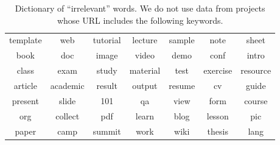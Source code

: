 \documentclass[sigconf,anonymous,review]{acmart}
\begin{document}
 
\begin{table}[!b]
\caption{Dictionary of ``irrelevant'' words. We do not use data from projects whose URL includes the following keywords.}
\label{tbl:dict}
\begin{adjustbox}{max width=0.48\textwidth}
\begin{tabular}{ccccccc}
\rowcolor[HTML]{BDBDBD} 
\multicolumn{7}{c}{\cellcolor[HTML]{BDBDBD}{\color[HTML]{000000} Suspicious Keywords}} \\ \hline
\rowcolor[HTML]{FFFFFF} 
{\color[HTML]{000000} template} & {\color[HTML]{000000} web} & {\color[HTML]{000000} tutorial} & {\color[HTML]{000000} lecture} & {\color[HTML]{000000} sample} & {\color[HTML]{000000} note} & {\color[HTML]{000000} sheet} \\
\rowcolor[HTML]{F3F3F3} 
{\color[HTML]{000000} book} & {\color[HTML]{000000} doc} & {\color[HTML]{000000} image} & {\color[HTML]{000000} video} & {\color[HTML]{000000} demo} & {\color[HTML]{000000} conf} & {\color[HTML]{000000} intro} \\
\rowcolor[HTML]{FFFFFF} 
{\color[HTML]{000000} class} & {\color[HTML]{000000} exam} & {\color[HTML]{000000} study} & {\color[HTML]{000000} material} & {\color[HTML]{000000} test} & {\color[HTML]{000000} exercise} & {\color[HTML]{000000} resource} \\
\rowcolor[HTML]{F3F3F3} 
{\color[HTML]{000000} article} & {\color[HTML]{000000} academic} & {\color[HTML]{000000} result} & {\color[HTML]{000000} output} & {\color[HTML]{000000} resume} & {\color[HTML]{000000} cv} & {\color[HTML]{000000} guide} \\
\rowcolor[HTML]{FFFFFF} 
{\color[HTML]{000000} present} & {\color[HTML]{000000} slide} & {\color[HTML]{000000} 101} & {\color[HTML]{000000} qa} & {\color[HTML]{000000} view} & {\color[HTML]{000000} form} & {\color[HTML]{000000} course} \\
\rowcolor[HTML]{F3F3F3} 
{\color[HTML]{000000} org} & {\color[HTML]{000000} collect} & {\color[HTML]{000000} pdf} & {\color[HTML]{000000} learn} & {\color[HTML]{000000} blog} & {\color[HTML]{000000} lesson} & {\color[HTML]{000000} pic} \\
\rowcolor[HTML]{FFFFFF} 
{\color[HTML]{000000} paper} & {\color[HTML]{000000} camp} & {\color[HTML]{000000} summit} & {\color[HTML]{000000} work} & {\color[HTML]{000000} wiki} & {\color[HTML]{000000} thesis} & {\color[HTML]{000000} lang}
\end{tabular}
\end{adjustbox}
\end{table}
  
\end{document}
